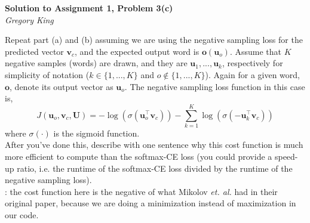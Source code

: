 \documentclass[letter,12pt]{article}
\newcommand{\myhwtitle}[3]
{\begin{center}
{\large {\bf Solution to Assignment {#1}, Problem {#2}}}\\
\medskip 
{\it {#3}} %
\end{center}}
\begin{document}
\myhwtitle{1}{3(c)}{Gregory King}
\bigskip
\noindent Repeat part (a) and (b) assuming we are using the negative sampling loss for the predicted vector ${\boldsymbol v}_{c}$, and 
the expected output word is ${\boldsymbol o}({\boldsymbol u}_{o})$. Assume that $K$ negative samples (words) are drawn, and they are ${\boldsymbol u}_{1},...,{\boldsymbol u}_{k}$, respectively for simplicity of notation ($k\in\{1,...,K\}$ and $o\notin\{1,...,K\}$). Again for a given word, ${\boldsymbol o}$, denote its output vector as ${\boldsymbol u}_{o}$. The negative sampling loss function in this case is,
\begin{equation}
J({\boldsymbol u}_{o}, {\boldsymbol v}_{c}, {\boldsymbol U}) = -\log(\sigma( {\boldsymbol u}^{\top}_{o}{\boldsymbol v}_{c})) - \sum^{K}_{k=1}\log(\sigma(- {\boldsymbol u}^{\top}_{k}{\boldsymbol v}_{c}))
\end{equation}
where $\sigma(\cdot)$ is the sigmoid function.\\

\noindent After you've done this, describe with one sentence why this cost function is much more efficient to
compute than the softmax-CE loss (you could provide a speed-up ratio, i.e. the runtime of the softmax-CE loss divided by the
runtime of the negative sampling loss).\\

: the cost function here is the negative of what Mikolov \textit{et. al.} had in their original paper,
because we are doing a minimization instead of maximization in our code.\vspace{5mm}
\end{document}
